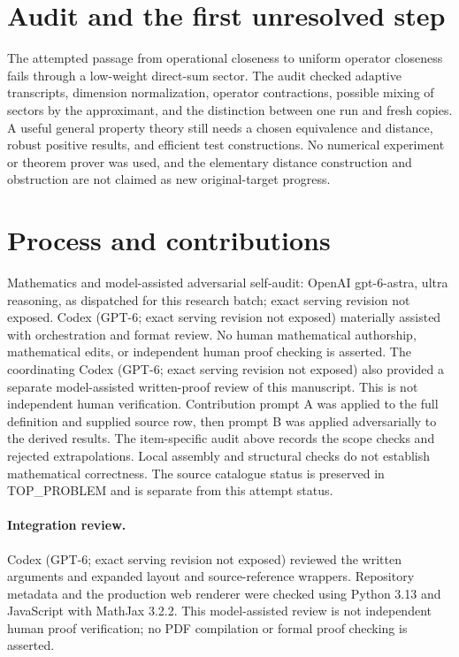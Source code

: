 \documentclass[11pt]{article}
\begin{document}
\section{Audit and the first unresolved step}
The attempted passage from operational closeness to uniform
operator closeness fails through a low-weight direct-sum sector.
The audit checked adaptive transcripts, dimension normalization,
operator contractions, possible mixing of sectors by the
approximant, and the distinction between one run and fresh copies.
A useful general property theory still needs a chosen equivalence
and distance, robust positive results, and efficient test
constructions. No numerical experiment or theorem prover was
used, and the elementary distance construction and obstruction
are not claimed as new original-target progress.

\section{Process and contributions}
Mathematics and model-assisted adversarial self-audit: OpenAI gpt-6-astra, ultra reasoning, as dispatched for this research batch; exact serving revision not exposed. Codex (GPT-6; exact serving revision not exposed) materially assisted with orchestration and format review. No human mathematical authorship, mathematical edits, or independent human proof checking is asserted.
The coordinating Codex (GPT-6; exact serving revision not exposed) also provided a separate model-assisted written-proof review of this manuscript. This is not independent human verification.
Contribution prompt A was applied to the full definition and supplied source row, then prompt B was applied adversarially to the derived results. The item-specific audit above records the scope checks and rejected extrapolations. Local assembly and structural checks do not establish mathematical correctness. The source catalogue status is preserved in TOP\_PROBLEM and is separate from this attempt status.
\paragraph{Integration review.} Codex (GPT-6; exact serving revision not exposed) reviewed the written arguments and expanded layout and source-reference wrappers. Repository metadata and the production web renderer were checked using Python 3.13 and JavaScript with MathJax 3.2.2. This model-assisted review is not independent human proof verification; no PDF compilation or formal proof checking is asserted.
\end{document}
